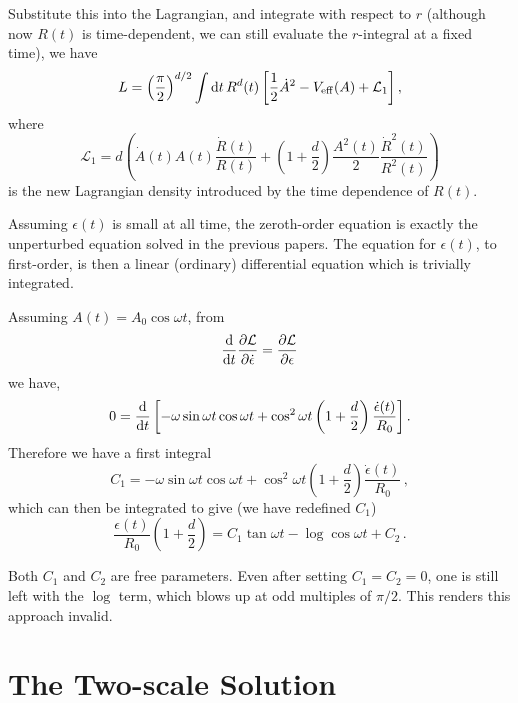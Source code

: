 \documentclass[11pt]{book}
\begin{document}
Substitute this into the Lagrangian, and integrate with respect to $r$ (although now $R(t)$ is time-dependent, we can still evaluate the $r$-integral at a fixed time), we have
\begin{equation}
 L = \left(\frac{\pi}{2}\right)^{d/2}\int {\rm d}t\, R^d(t) \left[ \frac{1}{2}\dot{A}^2 - V_{\rm eff} (A) +
    \mathcal{L}_1\right],
\end{equation}
where
\begin{equation}
  \mathcal{L}_1 = d\left( \dot{A}(t)A(t)\frac{\dot{R}(t)}{R(t)} +\left(1+\frac{d}{2}\right)\frac{A^2(t)}{2}\frac{\dot{R}^2(t)}{R^2(t)}\right)
\end{equation}
is the new Lagrangian density introduced by the time dependence of $R(t)$.

Assuming $\epsilon(t)$ is small at all time, the zeroth-order equation is exactly the unperturbed equation solved in the previous papers. The equation for $\epsilon(t)$, to first-order, is then a linear (ordinary) differential equation which is trivially integrated.

Assuming $A(t)=A_0\cos\omega t$, from
\begin{equation}
  \frac{\rm d}{{\rm d}t}\frac{\partial \mathcal{L}}{\partial \dot{\epsilon}} =
  \frac{\partial\mathcal{L}}{\partial \epsilon}
\end{equation}
we have,
\begin{equation}
  0 = \frac{\rm d}{{\rm d}t}\left[-\omega\sin\omega t\cos\omega t + \cos^2\omega t\left(1+\frac{d}{2}
    \right)\frac{\dot{\epsilon}(t)}{R_0}\right].
\end{equation}
Therefore we have a first integral
\begin{equation}
  C_1 = -\omega\sin\omega t\cos\omega t + \cos^2\omega t\left(1+\frac{d}{2}
  \right)\frac{\dot{\epsilon}(t)}{R_0}\,,
\end{equation}
which can then be integrated to give (we have redefined $C_1$)
\begin{equation}\label{sol}
  \frac{\epsilon(t)}{R_0}\left(1+\frac{d}{2}\right)
  = C_1\tan\omega t  - \log\cos\omega t + C_2\,.
\end{equation}

Both $C_1$ and $C_2$ are free parameters. Even after setting $C_1=C_2=0$, one is still left with the $\log$ term, which blows up at odd multiples of $\pi/2$. This renders this approach invalid.

\chapter{The Two-scale Solution}\label{exactsol}
\end{document}
